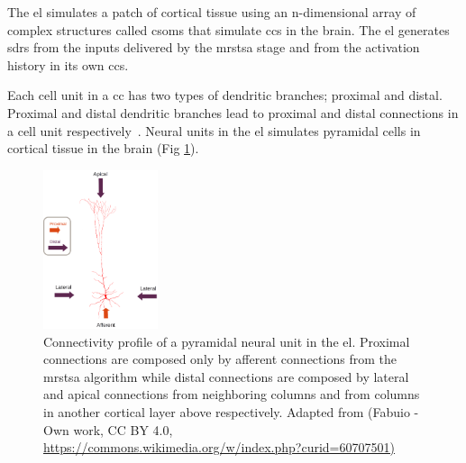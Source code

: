 \documentclass[11pt,a4paper]{article}
\begin{document}
The \gls{el} simulates a patch of cortical tissue using an n-dimensional array of complex structures called \glspl{csom} that simulate \glspl{cc} in the brain. The \gls{el} generates \glspl{sdr} \cite{ahmad_2016} from the inputs delivered by the \gls{mrstsa} stage and from the activation history in its own \glspl{cc}. 

Each cell unit in a \gls{cc} has two types of dendritic branches; proximal and distal. Proximal and distal dendritic branches lead to proximal and distal connections in a cell unit respectively~\cite{dematties2018}. Neural units in the \gls{el} simulates pyramidal cells in cortical tissue in the brain (Fig \ref{fig:Pyramidal_Cell}). 

\begin{figure}[h!]
    \centering
    \includegraphics[width=0.3\textwidth]{Pyramidal_Cell.png}
    \caption{Connectivity profile of a pyramidal neural unit in the \gls{el}. Proximal connections are composed only by afferent connections from the \gls{mrstsa} algorithm while distal connections are composed by lateral and apical connections from neighboring columns and    from columns in another cortical layer above respectively. Adapted from (Fabuio - Own work, CC BY 4.0, \url{https://commons.wikimedia.org/w/index.php?curid=60707501)}}
    \label{fig:Pyramidal_Cell}
\end{figure}


\end{document}
